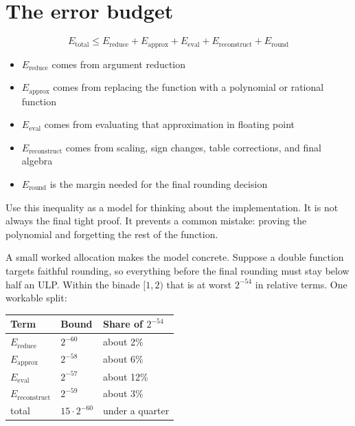 \documentclass[manuscript, nonacm]{acmart}
\begin{document}
    \FloatBarrier



    \section{The error budget}

    \[
        E_\mathrm{total} \le E_\mathrm{reduce} + E_\mathrm{approx} +
        E_\mathrm{eval} + E_\mathrm{reconstruct} + E_\mathrm{round}
    \]

    \begin{itemize}
        \item $E_\mathrm{reduce}$ comes from argument reduction
        \item $E_\mathrm{approx}$ comes from replacing the function with a
        polynomial or rational function
        \item $E_\mathrm{eval}$ comes from evaluating that approximation in
        floating point
        \item $E_\mathrm{reconstruct}$ comes from scaling, sign changes, table
        corrections, and final algebra
        \item $E_\mathrm{round}$ is the margin needed for the final rounding
        decision
    \end{itemize}

    Use this inequality as a model for thinking about the implementation. It is
    not always the final tight proof. It prevents a common mistake: proving the
    polynomial and forgetting the rest of the function.

    A small worked allocation makes the model concrete. Suppose a double
    function targets faithful rounding, so everything before the final
    rounding must stay below half an ULP. Within the binade $[1, 2)$ that is
    at worst $2^{-54}$ in relative terms. One workable split:

    \begin{table}[tbp]
        \centering
        \begin{tabular}{lll}
            \toprule
            Term                     & Bound              & Share of $2^{-54}$ \\
            \midrule
            $E_\mathrm{reduce}$      & $2^{-60}$          & about 2\%          \\
            $E_\mathrm{approx}$      & $2^{-58}$          & about 6\%          \\
            $E_\mathrm{eval}$        & $2^{-57}$          & about 12\%         \\
            $E_\mathrm{reconstruct}$ & $2^{-59}$          & about 3\%          \\
            \midrule
            total                    & $15 \cdot 2^{-60}$ & under a quarter    \\
            \bottomrule
        \end{tabular}
    \end{table}
\end{document}
